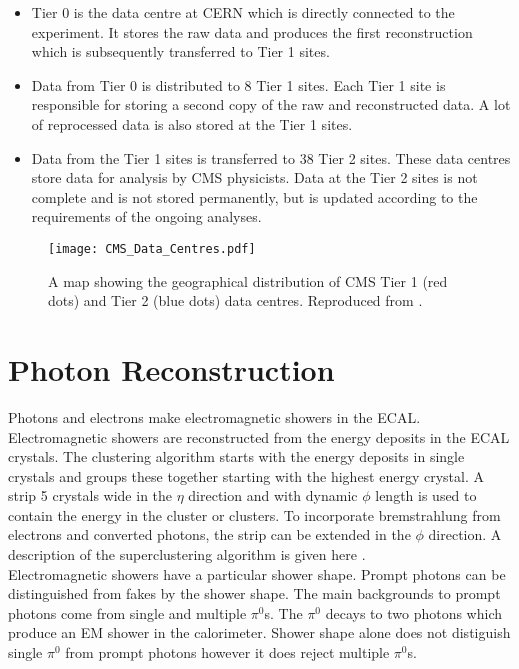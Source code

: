 \begin{itemize}
\item Tier 0 is the data centre at CERN which is directly connected to the
experiment. It stores the raw data and produces the first reconstruction which
is subsequently transferred to Tier 1 sites. 
\item Data from Tier 0 is distributed to 8 Tier 1 sites. Each Tier 1 site is 
responsible for storing a second copy of the raw and reconstructed data. A lot 
of reprocessed data is also stored at the Tier 1 sites. 
\item Data from the Tier 1 sites is transferred to 38 Tier 2 sites. These data
centres store data for analysis by CMS physicists. Data at the Tier 2 sites is
not complete and is not stored permanently, but is updated according to the
requirements of the ongoing analyses.
\end{itemize}

\begin{figure}
\texttt{[image: CMS\_Data\_Centres.pdf]}
\caption{A map showing the geographical distribution of CMS Tier 1 (red dots)
and Tier 2 (blue dots) data centres. Reproduced from \cite{grid}.}
\label{fig:CMS_Data_Centres}
\end{figure}

\section{Photon Reconstruction}
\label{sec:photon_recontruction}

Photons and electrons make electromagnetic showers in the ECAL. Electromagnetic 
showers are reconstructed from the energy deposits in the ECAL crystals. The 
clustering algorithm starts with the energy deposits in single crystals and 
groups these together starting with the highest energy crystal. A strip 5 
crystals wide in the $\eta$ direction and with dynamic $\phi$ length is used to 
contain the energy in the cluster or clusters. To incorporate bremstrahlung from 
electrons and converted photons, the strip can be extended in the $\phi$ 
direction. A description of the superclustering algorithm is given here 
\cite{supercluster}. \\ 

Electromagnetic showers have a particular shower shape. Prompt photons can be 
distinguished from fakes by the shower shape. The main backgrounds to prompt 
photons come from single and multiple $\pi^{0}$s. The $\pi^{0}$ decays to two
photons which produce an EM shower in the calorimeter. Shower shape alone
does not distiguish single $\pi^{0}$ from prompt photons however it does reject 
multiple $\pi^{0}$s. \\

